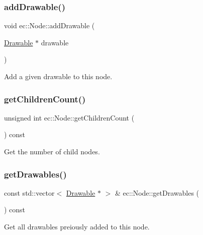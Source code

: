 \subsubsection{\texorpdfstring{add\+Drawable()}{addDrawable()}}
{\footnotesize\ttfamily void ec\+::\+Node\+::add\+Drawable (\begin{DoxyParamCaption}\item[{\mbox{\hyperlink{classec_1_1_drawable}{Drawable}} $\ast$}]{drawable }\end{DoxyParamCaption})}



Add a given drawable to this node. 

\mbox{\label{classec_1_1_node_a3fb0342e532d42984870f598ec4d0ba3}} 
\subsubsection{\texorpdfstring{get\+Children\+Count()}{getChildrenCount()}}
{\footnotesize\ttfamily unsigned int ec\+::\+Node\+::get\+Children\+Count (\begin{DoxyParamCaption}{ }\end{DoxyParamCaption}) const}



Get the number of child nodes. 

\mbox{\label{classec_1_1_node_a2403cd39000eceffdec878133f621e3a}} 
\subsubsection{\texorpdfstring{get\+Drawables()}{getDrawables()}}
{\footnotesize\ttfamily const std\+::vector$<$ \mbox{\hyperlink{classec_1_1_drawable}{Drawable}} $\ast$ $>$ \& ec\+::\+Node\+::get\+Drawables (\begin{DoxyParamCaption}{ }\end{DoxyParamCaption}) const\hspace{0.3cm}{\ttfamily [virtual]}}



Get all drawables preiously added to this node. 


